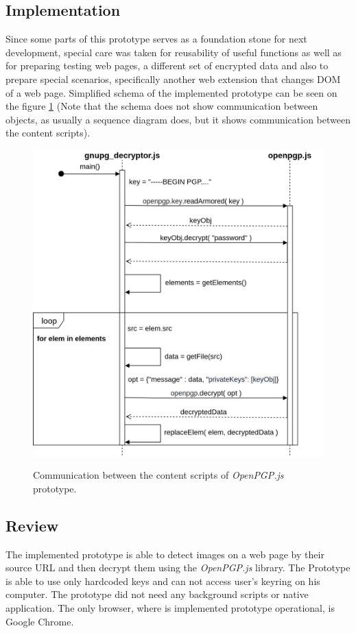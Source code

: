 \subsection{Implementation}
Since some parts of this prototype serves as a foundation stone for next development, special care was taken for reusability of useful functions as well as for preparing testing web pages, a different set of encrypted data and also to prepare special scenarios, specifically another web extension that changes DOM of a web page. Simplified schema of the implemented prototype can be seen on the figure \ref{img:openpgp-sequence} (Note that the schema does not show communication between objects, as usually a sequence diagram does, but it shows communication between the content scripts).
\begin{figure}[H]
    \begin{center}
        \label{img:openpgp-sequence}
        \includegraphics[width=1.3\textwidth,angle=90]{obrazky-figures/openpgp-sequence.png}
        \caption{Communication between the content scripts of \textit{OpenPGP.js} prototype.}
    \end{center}
\end{figure}


\subsection{Review}
The implemented prototype is able to detect images on a web page by their source URL and then decrypt them using the \textit{OpenPGP.js} library. The Prototype is able to use only hardcoded keys and can not access user's keyring on his computer. The prototype did not need any background scripts or native application. The only browser, where is implemented prototype operational, is Google Chrome.

